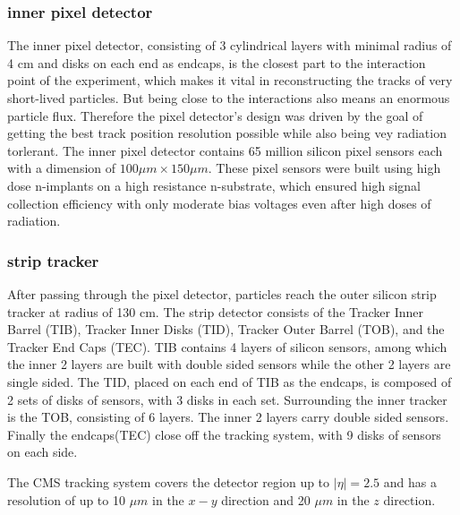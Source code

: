 \subsubsection{inner pixel detector}
The inner pixel detector, consisting of 3 cylindrical layers with minimal radius of 4 cm and disks on each end as endcaps, is the closest part to the interaction point of the experiment, which makes it vital in reconstructing the tracks of very short-lived particles. But being close to the interactions also means an enormous particle flux. Therefore the pixel detector's design was driven by the goal of getting the best track position resolution possible while also being vey radiation torlerant. The inner pixel detector contains 65 million silicon pixel sensors each with a dimension of $100\mu m \times 150\mu m$. These pixel sensors were built using high dose n-implants on a high resistance n-substrate, which ensured high signal collection efficiency with only moderate bias voltages even after high doses of radiation.
\subsubsection{strip tracker}
After passing through the pixel detector, particles reach the outer silicon strip tracker at radius of 130 cm. The strip detector consists of the Tracker Inner Barrel (TIB), Tracker Inner Disks (TID), Tracker Outer Barrel (TOB), and the Tracker End Caps (TEC). TIB contains 4 layers of silicon sensors, among which the inner 2 layers are built with double sided sensors while the other 2 layers are single sided. The TID, placed on each end of TIB as the endcaps, is composed of 2 sets of disks of sensors, with 3 disks in each set. Surrounding the inner tracker is the TOB, consisting of 6 layers. The inner 2 layers carry double sided sensors. Finally the endcaps(TEC) close off the tracking system, with 9 disks of sensors on each side. 

\vspace{0.3cm}
The CMS tracking system covers the detector region up to $|\eta| = 2.5$ and has a resolution of up to 10 $\mu m$ in the $x-y$ direction and 20 $\mu m$ in the $z$ direction. 

